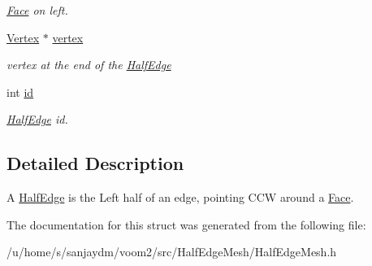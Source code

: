 \begin{DoxyCompactItemize}
\begin{DoxyCompactList}\small\item\em \hyperlink{structvoom_1_1_face}{Face} on left. \item\end{DoxyCompactList}\item 
\hypertarget{structvoom_1_1_half_edge_af4a84e40e4b24252e1fc07e69644044d}{
\hyperlink{structvoom_1_1_vertex}{Vertex} $\ast$ \hyperlink{structvoom_1_1_half_edge_af4a84e40e4b24252e1fc07e69644044d}{vertex}}
\label{structvoom_1_1_half_edge_af4a84e40e4b24252e1fc07e69644044d}

\begin{DoxyCompactList}\small\item\em vertex at the end of the \hyperlink{structvoom_1_1_half_edge}{HalfEdge} \item\end{DoxyCompactList}\item 
\hypertarget{structvoom_1_1_half_edge_a7372f809ac23c5ba66eabb0fc768f463}{
int \hyperlink{structvoom_1_1_half_edge_a7372f809ac23c5ba66eabb0fc768f463}{id}}
\label{structvoom_1_1_half_edge_a7372f809ac23c5ba66eabb0fc768f463}

\begin{DoxyCompactList}\small\item\em \hyperlink{structvoom_1_1_half_edge}{HalfEdge} id. \item\end{DoxyCompactList}\end{DoxyCompactItemize}


\subsection{Detailed Description}
A \hyperlink{structvoom_1_1_half_edge}{HalfEdge} is the Left half of an edge, pointing CCW around a \hyperlink{structvoom_1_1_face}{Face}. 

The documentation for this struct was generated from the following file:\begin{DoxyCompactItemize}
\item 
/u/home/s/sanjaydm/voom2/src/HalfEdgeMesh/HalfEdgeMesh.h\end{DoxyCompactItemize}
